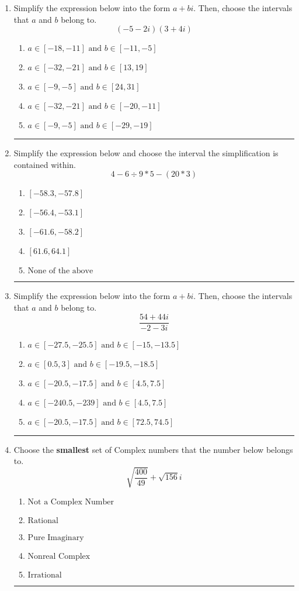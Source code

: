 \documentclass[14pt]{extbook}
\newcommand{\litem}[1]{\item#1\hspace*{-1cm}\rule{\textwidth}{0.4pt}}
\begin{document}
\begin{enumerate}
{\begin{enumerate}[label=\Alph*.]
\end{enumerate} }
\litem{
Simplify the expression below into the form $a+bi$. Then, choose the intervals that $a$ and $b$ belong to.\[ (-5 - 2 i)(3 + 4 i) \]\begin{enumerate}[label=\Alph*.]
\item \( a \in [-18, -11] \text{ and } b \in [-11, -5] \)
\item \( a \in [-32, -21] \text{ and } b \in [13, 19] \)
\item \( a \in [-9, -5] \text{ and } b \in [24, 31] \)
\item \( a \in [-32, -21] \text{ and } b \in [-20, -11] \)
\item \( a \in [-9, -5] \text{ and } b \in [-29, -19] \)

\end{enumerate} }
\litem{
Simplify the expression below and choose the interval the simplification is contained within.\[ 4 - 6 \div 9 * 5 - (20 * 3) \]\begin{enumerate}[label=\Alph*.]
\item \( [-58.3, -57.8] \)
\item \( [-56.4, -53.1] \)
\item \( [-61.6, -58.2] \)
\item \( [61.6, 64.1] \)
\item \( \text{None of the above} \)

\end{enumerate} }
\litem{
Simplify the expression below into the form $a+bi$. Then, choose the intervals that $a$ and $b$ belong to.\[ \frac{54 + 44 i}{-2 - 3 i} \]\begin{enumerate}[label=\Alph*.]
\item \( a \in [-27.5, -25.5] \text{ and } b \in [-15, -13.5] \)
\item \( a \in [0.5, 3] \text{ and } b \in [-19.5, -18.5] \)
\item \( a \in [-20.5, -17.5] \text{ and } b \in [4.5, 7.5] \)
\item \( a \in [-240.5, -239] \text{ and } b \in [4.5, 7.5] \)
\item \( a \in [-20.5, -17.5] \text{ and } b \in [72.5, 74.5] \)

\end{enumerate} }
\litem{
Choose the \textbf{smallest} set of Complex numbers that the number below belongs to.\[ \sqrt{\frac{400}{49}}+\sqrt{156} i \]\begin{enumerate}[label=\Alph*.]
\item \( \text{Not a Complex Number} \)
\item \( \text{Rational} \)
\item \( \text{Pure Imaginary} \)
\item \( \text{Nonreal Complex} \)
\item \( \text{Irrational} \)


\end{enumerate}}
\end{enumerate}
\end{document}
